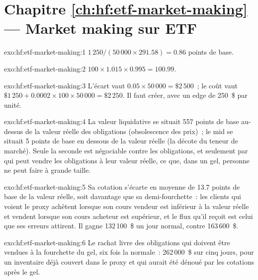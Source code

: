 \section*{Chapitre \ref{ch:hf:etf-market-making} --- Market making sur ETF}

\begin{solution}{exo:hf:etf-market-making:1}
$1\,250/(50\,000\times291.58)=0.86$ points de base.
\end{solution}

\begin{solution}{exo:hf:etf-market-making:2}
$100\times1.015\times0.995=100.99$.
\end{solution}

\begin{solution}{exo:hf:etf-market-making:3}
L'écart vaut $0.05\times50\,000=\$2\,500$~; le coût vaut $\$1\,250+0.0002\times100\times50\,000=\$2\,250$. Il faut créer, avec un edge de 250~\$ par unité.
\end{solution}

\begin{solution}{exo:hf:etf-market-making:4}
La valeur liquidative se situait 557 points de base au-dessus de la valeur réelle des obligations (obsolescence des prix)~; le mid se situait 5 points de base
en dessous de la valeur réelle (la décote du teneur de marché). Seule la seconde est négociable contre les obligations, et seulement par qui peut vendre les
obligations à leur valeur réelle, ce que, dans un gel, personne ne peut faire à grande taille.
\end{solution}

\begin{solution}{exo:hf:etf-market-making:5}
Sa cotation s'écarte en moyenne de 13.7 points de base de la valeur réelle, soit davantage que sa demi-fourchette~: les clients qui voient le proxy achètent
lorsque son cours vendeur est inférieur à la valeur réelle et vendent lorsque son cours acheteur est supérieur, et le flux qu'il reçoit est celui que ses erreurs attirent. Il gagne 132\,100~\$ un jour normal, contre 163\,600~\$.
\end{solution}

\begin{solution}{exo:hf:etf-market-making:6}
Le rachat livre des obligations qui doivent être vendues à la fourchette du gel, six fois la normale~: 262\,000~\$ sur cinq jours, pour un inventaire
déjà couvert dans le proxy et qui aurait été dénoué par les cotations après le gel.
\end{solution}

